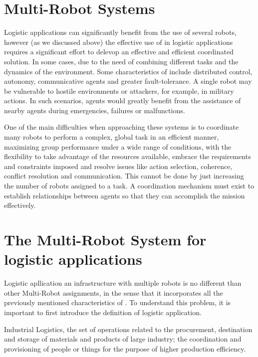 \section{Multi-Robot Systems}
Logistic applications can significantly benefit from the use of several robots, however  
(as we discussed above) the effective use of \mrs in logistic applications requires a 
significant effort to delevop an effective and efficient coordinated solution.
In some cases, due to the need of combining different tasks and the dynamics of the environment.
Some characteristics of \mrs include distributed control, autonomy,
communicative agents and greater fault-tolerance.
A single robot may be vulnerable to hostile environments or attackers, for example, in military actions.
In such scenarios, agents would greatly benefit from the assistance of nearby agents during emergencies,
failures or malfunctions.

One of the main difficulties when approaching these systems is to coordinate
many robots to perform a complex, global task in an efficient manner, maximizing
group performance under a wide range of conditions, with the flexibility to take
advantage of the resources available, embrace the requirements and constraints
imposed and resolve issues like action selection, coherence, conflict resolution and
communication. This cannot be done by just increasing the number of robots
assigned to a task.
A coordination mechanism must exist to establish relationships between agents so
that they can accomplish the mission effectively.

\section{The Multi-Robot System for logistic applications} \label{mrs:logistic}
Logistic apllication an infrastructure with multiple robots is no different than other Multi-Robot
assignments, in the sense that it incorporates all the previously mentioned
characteristics of \mrs. To understand this problem, it is important to first
introduce the definition of logistic application.

\begin{mydef}
    Industrial Logistics, the set of operations related to the procurement,
    destination and storage of materials and products of large industry; 
    the coordination and provisioning of people or things for the purpose of higher production efficiency.
\end{mydef}

